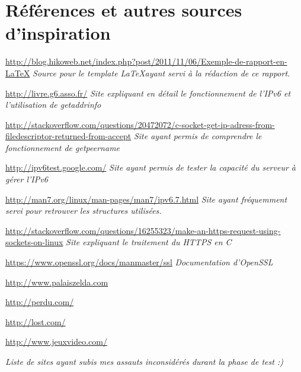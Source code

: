 \section*{Références et autres sources d'inspiration}

\url{http://blog.hikoweb.net/index.php?post/2011/11/06/Exemple-de-rapport-en-LaTeX} \linebreak
\emph{Source pour le template \LaTeX ayant servi à la rédaction de ce rapport.} \linebreak

\url{http://livre.g6.asso.fr/} \linebreak
\emph{Site expliquant en détail le fonctionnement de l'IPv6 et l'utilisation de getaddrinfo} \linebreak

\url{http://stackoverflow.com/questions/20472072/c-socket-get-ip-adress-from-filedescriptor-returned-from-accept} \linebreak
\emph{Site ayant permis de comprendre le fonctionnement de getpeername} \linebreak

\url{http://ipv6test.google.com/} \linebreak
\emph{Site ayant permis de tester la capacité du serveur à gérer l'IPv6} \linebreak

\url{http://man7.org/linux/man-pages/man7/ipv6.7.html} \linebreak
\emph{Site ayant fréquemment servi pour retrouver les structures utilisées.} \linebreak

\url{http://stackoverflow.com/questions/16255323/make-an-https-request-using-sockets-on-linux} \linebreak
\emph{Site expliquant le traitement du HTTPS en C} \linebreak

\url{https://www.openssl.org/docs/manmaster/ssl} \linebreak
\emph{Documentation d'OpenSSL} \linebreak

\url{http://www.palaiszelda.com} \linebreak

\url{http://perdu.com/} \linebreak

\url{http://lost.com/} \linebreak

\url{http://www.jeuxvideo.com/} \linebreak

\emph{Liste de sites ayant subis mes assauts inconsidérés durant la phase de test :)} \linebreak

